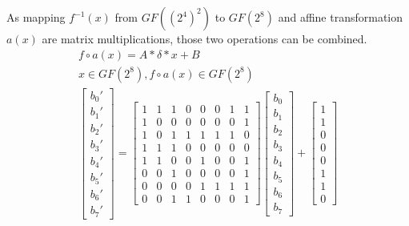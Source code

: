 As mapping $f^{-1}(x)$ from $GF((2^4)^2)$ to $GF(2^8)$ and affine transformation $a(x)$ are matrix multiplications, those two operations can be combined.
\begin{equation}
\begin{gathered}
\label{eq:affine}
f \circ a(x) = A * \delta * x + B\\
x \in GF(2^8), f \circ a(x) \in GF(2^8) \\
\begin{bmatrix}
b_0'\\b_1'\\b_2'\\b_3'\\b_4'\\b_5'\\b_6'\\b_7'
\end{bmatrix}
=
\begin{bmatrix}
    1 & 1 & 1 & 0 & 0 & 0 & 1 & 1 \\
    1 & 0 & 0 & 0 & 0 & 0 & 0 & 1 \\
    1 & 0 & 1 & 1 & 1 & 1 & 1 & 0 \\
    1 & 1 & 1 & 0 & 0 & 0 & 0 & 0 \\
    1 & 1 & 0 & 0 & 1 & 0 & 0 & 1 \\
    0 & 0 & 1 & 0 & 0 & 0 & 0 & 1 \\
    0 & 0 & 0 & 0 & 1 & 1 & 1 & 1 \\
    0 & 0 & 1 & 1 & 0 & 0 & 0 & 1
\end{bmatrix}
\begin{bmatrix}
b_0\\b_1\\b_2\\b_3\\b_4\\b_5\\b_6\\b_7
\end{bmatrix}
+
\begin{bmatrix}
1\\1\\0\\0\\0\\1\\1\\0
\end{bmatrix}
\end{gathered}
\end{equation}



